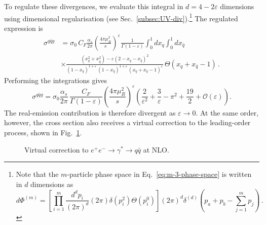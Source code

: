 To regulate these divergences, we evaluate this integral in
$d=4-2\varepsilon$ dimensions using dimensional regularisation
(see Sec.~\ref{subsec:UV-div}).\footnote{Note that the $m$-particle
phase space in Eq.~\eqref{eq:m-3-phase-space} is written in
$d$ dimensions as 
\begin{equation}
\label{eq:m-phase-d}
d\Phi^{(m)}=\left[\prod_{i=1}^{m}\frac{d^d p_i}{(2\pi)^d}(2\pi)\delta(p_i^2)\Theta(p_i^0)\right]
(2\pi)^d\delta^{(d)}\left(p_a+p_b-\sum_{j=1}^{m}p_j\right)\,.
\end{equation}} 
The regulated expression is
\begin{equation}
\label{eq:qqg-real-d-dim}
\begin{aligned}
	\sigma^{q\bar{q}g}&=\sigma_0\,C_F\frac{\alpha_s}{2\pi}\left(\frac{4\pi\mu_R^2}{s}\right)^\varepsilon\frac{1}{\Gamma(1-\varepsilon)}\int_0^1dx_q\int_0^1dx_{\bar{q}}\\
	&\times\frac{(x_q^2+x_{\bar{q}}^2)-\varepsilon(2-x_q-x_{\bar{q}})^2}{(1-x_q)^{1+\varepsilon}\,(1-x_{\bar{q}})^{1+\varepsilon}\,(x_q+x_{\bar{q}}-1)^\varepsilon}\,\Theta\left(x_q+x_{\bar{q}}-1\right)\,.
	\end{aligned}
\end{equation}
Performing the integrations gives
\begin{equation}
\label{eq:qqg-real-d-dim-more}
   \sigma^{q\bar{q}g}=\sigma_0 \frac{\alpha_s}{2\pi}\,
      \frac{C_F}{\Gamma(1-\varepsilon)}
      \left(\frac{4\pi\mu_R^2}{s}\right)^{\varepsilon}
      \left(
          \frac{2}{\varepsilon^2}
        + \frac{3}{\varepsilon}
        - \pi^2
        + \frac{19}{2}
        + \mathcal{O}(\varepsilon)
      \right).
\end{equation}
The real-emission contribution is therefore divergent as
$\varepsilon\to0$. At the same order, however, the cross section also
receives a virtual correction to the leading-order process, shown in
Fig.~\ref{fig:photon-qq(g)}. 
\begin{figure}[h]
    \centering
  \caption{Virtual correction to $e^+e^- \to \gamma^* \to q\bar{q}$ at NLO.}    
  \label{fig:photon-qq(g)}
\end{figure}

